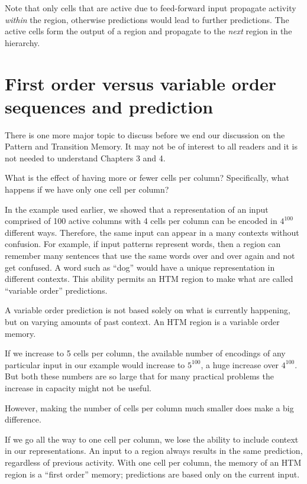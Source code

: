 Note that only cells that are active due to feed-forward input
propagate activity {\em within} the region, otherwise predictions
would lead to further predictions. The active cells form the output of a region and
propagate to the {\em next} region in the hierarchy.

\section*{First order versus variable order sequences and prediction}

There is one more major topic to discuss before we end our discussion
on the Pattern and Transition Memory. It may not be of interest to all
readers and it is not needed to understand Chapters 3 and 4.

What is the effect of having more or fewer cells per column?
Specifically, what happens if we have only one cell per column?

In the example used earlier, we showed that a representation of an
input comprised of 100 active columns with 4 cells per column can be
encoded in $4^{100}$ different ways. Therefore, the same input can
appear in a many contexts without confusion. For example, if input
patterns represent words, then a region can remember many sentences
that use the same words over and over again and not get confused. A
word such as ``dog'' would have a unique representation in different
contexts. This ability permits an HTM region to make what are called
``variable order'' predictions.

A variable order prediction is not based solely on what is currently
happening, but on varying amounts of past context. An HTM region is a
variable order memory.

If we increase to 5 cells per column, the available number of
encodings of any particular input in our example would increase to
$5^{100}$, a huge increase over $4^{100}$. But both these numbers are
so large that for many practical problems the increase in capacity
might not be useful.

However, making the number of cells per column much smaller does make
a big difference.

If we go all the way to one cell per column, we lose the ability to
include context in our representations. An input to a region always
results in the same prediction, regardless of previous activity. With
one cell per column, the memory of an HTM region is a ``first order''
memory; predictions are based only on the current input.


